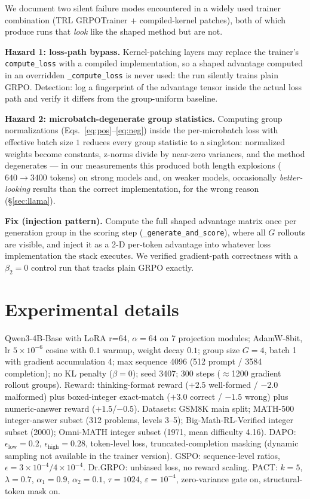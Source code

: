 \documentclass{article} %
\theoremstyle{plain}
\theoremstyle{definition}
\theoremstyle{remark}
\newcommand{\method}{PACT}
\begin{document}
We document two silent failure modes encountered in a widely used trainer combination (TRL GRPOTrainer + compiled-kernel patches), both of which produce runs that \emph{look} like the shaped method but are not.

\textbf{Hazard 1: loss-path bypass.} Kernel-patching layers may replace the trainer's \texttt{compute\_loss} with a compiled implementation, so a shaped advantage computed in an overridden \texttt{\_compute\_loss} is never used: the run silently trains plain GRPO. Detection: log a fingerprint of the advantage tensor inside the actual loss path and verify it differs from the group-uniform baseline.

\textbf{Hazard 2: microbatch-degenerate group statistics.} Computing group normalizations (Eqs.~\ref{eq:pos}--\ref{eq:neg}) inside the per-microbatch loss with effective batch size $1$ reduces every group statistic to a singleton: normalized weights become constants, z-norms divide by near-zero variances, and the method degenerates --- in our measurements this produced both length explosions ($640\to3400$ tokens) on strong models and, on weaker models, occasionally \emph{better-looking} results than the correct implementation, for the wrong reason (\S\ref{sec:llama}).

\textbf{Fix (injection pattern).} Compute the full shaped advantage matrix once per generation group in the scoring step (\texttt{\_generate\_and\_score}), where all $G$ rollouts are visible, and inject it as a 2-D per-token advantage into whatever loss implementation the stack executes. We verified gradient-path correctness with a $\beta_2{=}0$ control run that tracks plain GRPO exactly.

\section{Experimental details}
\label{app:setup}

Qwen3-4B-Base with LoRA r=64, $\alpha{=}64$ on 7 projection modules; AdamW-8bit, lr $5{\times}10^{-6}$ cosine with $0.1$ warmup, weight decay $0.1$; group size $G{=}4$, batch 1 with gradient accumulation 4; max sequence 4096 (512 prompt / 3584 completion); no KL penalty ($\beta{=}0$); seed 3407; 300 steps ($\approx$1200 gradient rollout groups). Reward: thinking-format reward ($+2.5$ well-formed / $-2.0$ malformed) plus boxed-integer exact-match ($+3.0$ correct / $-1.5$ wrong) plus numeric-answer reward ($+1.5$/$-0.5$). Datasets: GSM8K main split; MATH-500 integer-answer subset (312 problems, levels 3--5); Big-Math-RL-Verified integer subset (2000); Omni-MATH integer subset (1971, mean difficulty 4.16). DAPO: $\epsilon_{\mathrm{low}}{=}0.2$, $\epsilon_{\mathrm{high}}{=}0.28$, token-level loss, truncated-completion masking (dynamic sampling not available in the trainer version). GSPO: sequence-level ratios, $\epsilon = 3{\times}10^{-4}/4{\times}10^{-4}$. Dr.GRPO: unbiased loss, no reward scaling. \method{}: $k{=}5$, $\lambda{=}0.7$, $\alpha_1{=}0.9$, $\alpha_2{=}0.1$, $\tau{=}1024$, $\varepsilon{=}10^{-4}$, zero-variance gate on, structural-token mask on.
\end{document}

